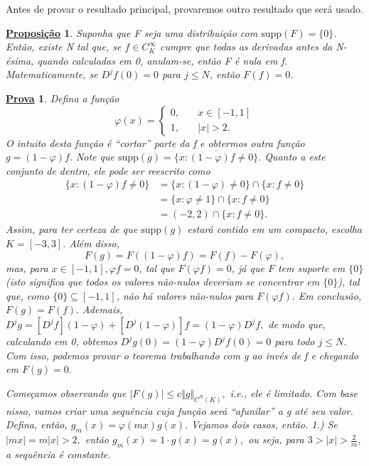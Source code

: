 \documentclass{article}
\newtheorem*{prop*}{\underline{Proposi\c c\~ao}}
\newtheorem*{proof*}{\underline{Prova}}
\begin{document}
  Antes de provar o resultado principal, provaremos outro resultado que será usado. 
 \begin{prop*}
   Suponha que F seja uma distribuição com \(\mathrm{supp}(F) = \{0\}\). Então, existe N tal que, se \(f\in C_{K}^{\infty}\) cumpre que todas as derivadas antes da N-ésima, quando calculadas em 0, anulam-se, então F é nula em f. Matematicamente, se \(D^{j}f(0) = 0\) para 
  \(j\leq N\), então \(F(f) = 0\).
 \end{prop*}
\begin{proof*}
  Defina a função 
    \[
      \varphi (x) = \left\{\begin{array}{ll}
            0,\quad &x\in [-1, 1]\\ 
            1,\quad &|x| > 2.
        \end{array}\right.
    \]
    O intuito desta função é ``cortar'' parte da f e obtermos outra função \(g = (1-\varphi )f.\) Note que \(\mathrm{supp}(g) = \overline{\{x: (1-\varphi )f\neq 0\}}.\) Quanto a este conjunto de dentro, ele pode ser reescrito como 
   \begin{align*}
     \{x: (1-\varphi )f\neq 0\} &= \{x:(1-\varphi)\neq0\}\cap \{x: f\neq 0\}\\
                                &= \{x: \varphi \neq 1\}\cap \{x: f\neq 0\}\\ 
                                &= (-2, 2)\cap \{x:f\neq 0\}.
   \end{align*}
   Assim, para ter certeza de que \(\mathrm{supp}(g)\) estará contido em um compacto, escolha \(K = [-3, 3].\) Além disso, 
     \[
       F(g) = F((1-\varphi )f) = F(f) - F(\varphi ),
     \]
    mas, para \(x\in [-1, 1], \varphi f = 0\), tal que \(F(\varphi f) = 0\), já que \(F\) tem suporte em \(\{0\}\) (isto significa que todos os valores não-nulos deveriam se concentrar em \(\{0\}\)), tal que, como \(\{0\}\subseteq [-1, 1]\), não há valores não-nulos para \(F(\varphi f).\)
    Em conclusão, \(F(g) = F(f).\) Ademais, \(D^{j}g = [D^{j}f](1-\varphi ) + [D^{j}(1-\varphi )]f = (1-\varphi )D^{j}f,\) de modo que, calculando em 0, obtemos \(D^{j}g(0) = (1-\varphi )D^{j}f(0) = 0\) para todo \(j\leq N\). Com isso, podemos provar o teorema trabalhando com g ao invés de f e chegando em \(F(g) = 0.\)

    Começamos observando que \(|F(g)|\leq c\Vert g \Vert_{C^{N}(K)},\) i.e., ele é limitado. Com base nisso, vamos criar uma sequência cuja função será ``afunilar'' a g até seu valor. Defina, então, \(g_{m}(x)=\varphi (mx)g(x).\) Vejamos dois casos, então.
     1.) Se \(|mx| = m|x| > 2, \) então \(g_{m}(x) = 1 \cdot g(x) = g(x),\) ou seja, para \(3 > |x| >\frac{2}{m}\), a sequência é constante.


\end{proof*}
\end{document}
